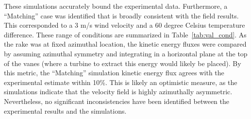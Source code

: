These simulations accurately bound the experimental data. Furthermore, a
``Matching'' case was identified that is broadly consistent with the
field results. This corresponded to a 3 m/s wind velocity and a 60
degree Celsius temperature difference. These range of conditions are
summarized in Table~\ref{tab:val_cond}. 
As the rake was at fixed azimuthal location, the kinetic energy fluxes were
compared by assuming azimuthal symmetry and integrating in a horizontal
plane at the top of the vanes (where a turbine to extract this energy
would likely be placed). By this metric, the ``Matching'' simulation
kinetic energy flux agrees with the experimental estimate within
10\%. This is likely an optimistic measure, as the simulations indicate
that the velocity field is highly azimuthally asymmetric. Nevertheless,
no significant inconsistencies have been identified between the
experimental results and the simulations. 


%
% 
%
% 
%
%
%
%
